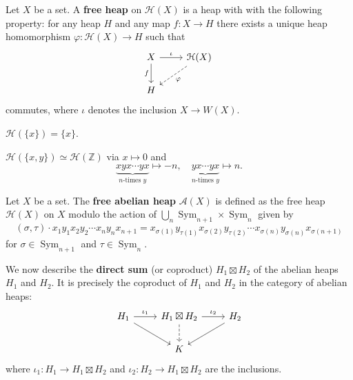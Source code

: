 \documentclass{svmult}
\newcommand{\Z}{\mathbb{Z}}
\newcommand{\Sym}{\operatorname{Sym}}
\begin{document}
\begin{definition}
    Let $X$ be a set. A \textbf{free heap} on $\mathcal{H}(X)$ is a heap with with the following
    property: for any heap $H$ and any map $f\colon X\to H$ there exists a unique
    heap homomorphism $\varphi\colon \mathcal{H}(X)\to H$ such that
\[\begin{tikzcd}
	X & {\mathcal{H}(X)} \\
	H
	\arrow["\iota", from=1-1, to=1-2]
	\arrow["f"', from=1-1, to=2-1]
	\arrow["{\varphi }", dashed, from=1-2, to=2-1]
\end{tikzcd}\]
    commutes, where $\iota$ denotes the inclusion $X\to W(X)$. 
\end{definition}

\begin{example}
        $\mathcal{H}(\{x\})=\{x\}$.
\end{example}

\begin{example}
        $\mathcal{H}(\{x,y\})\simeq \mathcal{H}(\Z)$ via $x\mapsto 0$ and
        \[
        \underbrace{xyx\cdots yx}_{\text{$n$-times $y$}}\mapsto -n,
        \quad
        \underbrace{yx\cdots yx}_{\text{$n$-times $y$}}\mapsto n.
        \]
\end{example}

\begin{example}
    Let $X$ be a set. The \textbf{free abelian heap} $\mathcal{A}(X)$ 
    is defined as the free heap $\mathcal{H}(X)$ on $X$ modulo
    the action of 
    $\bigcup_{n}\Sym_{n+1}\times\Sym_n$ given by 
    \[
    (\sigma,\tau)\cdot x_1y_1x_2y_2\cdots x_ny_nx_{n+1}
    =x_{\sigma(1)}y_{\tau(1)}x_{\sigma(2)}y_{\tau(2)}\cdots x_{\sigma(n)}y_{\sigma(n)}x_{\sigma(n+1)}
    \]
    for $\sigma\in\Sym_{n+1}$ and $\tau\in\Sym_{n}$. 
\end{example}

We now describe the \textbf{direct sum} (or coproduct) $H_1\boxtimes H_2$ of the 
abelian heaps $H_1$ and $H_2$. 
It is precisely the coproduct of 
$H_1$ and $H_2$ in the category of abelian heaps:
\[\begin{tikzcd}
	{H_1} & {H_1\boxtimes H_2} & {H_2} \\
	& K
	\arrow["{\iota_2}", from=1-2, to=1-3]
	\arrow[dashed, from=1-2, to=2-2]
	\arrow[from=1-3, to=2-2]
	\arrow["{\iota_1}", from=1-1, to=1-2]
	\arrow[from=1-1, to=2-2]
\end{tikzcd}\]
where  
$\iota_1\colon H_1\to H_1\boxtimes H_2$ and 
$\iota_2\colon H_2\to H_1\boxtimes H_2$ are the inclusions. 
\end{document}
